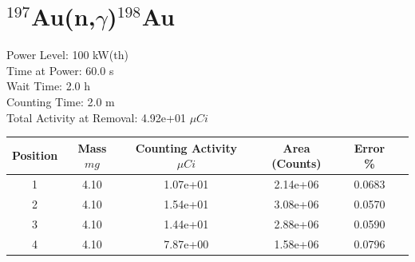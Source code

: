 \newpage

\section*{ $^{197}$Au(n,$\gamma$)$^{198}$Au }

Power Level: 100 kW(th) \\
Time at Power: 60.0 s \\
Wait Time:  2.0 h \\
Counting Time:  2.0 m \\
Total Activity at Removal: 4.92e+01 $\mu Ci$

\begin{table}[h]
\centering
\begin{tabular}{ |c|c|c|c|c|c| }
 \hline
 Position & Mass $mg$ & Counting Activity $\mu Ci$ & Area (Counts) & Error \% \\
 \hline 
 1 & 4.10 & 1.07e+01 & 2.14e+06 & 0.0683 \\ 
\hline
 2 & 4.10 & 1.54e+01 & 3.08e+06 & 0.0570 \\ 
\hline
 3 & 4.10 & 1.44e+01 & 2.88e+06 & 0.0590 \\ 
\hline
 4 & 4.10 & 7.87e+00 & 1.58e+06 & 0.0796 \\ 
\hline
\end{tabular}
\end{table}

